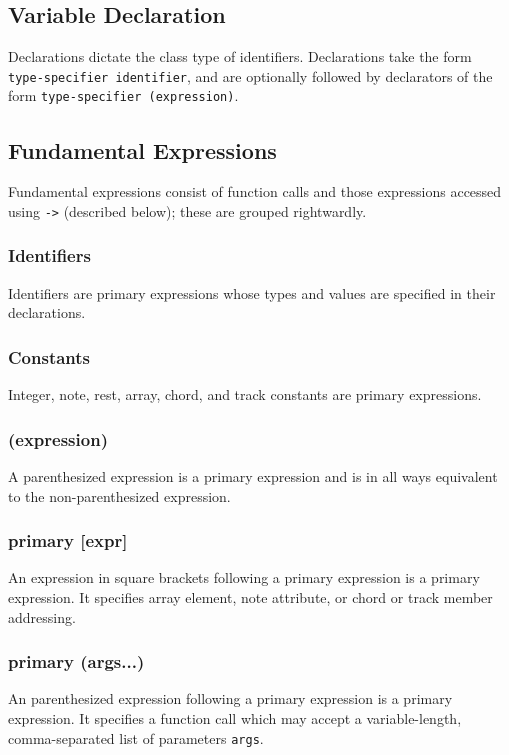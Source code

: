 \documentclass[letterpaper]{article}
\begin{document}
\subsection{Variable Declaration}
Declarations dictate the class type of identifiers. Declarations take the form
\texttt{type-specifier identifier}, and are optionally followed by declarators of the form \texttt{type-specifier (expression)}.

\subsection{Fundamental Expressions}
Fundamental expressions consist of function calls and those expressions accessed using \texttt{-\textgreater} (described below); these are grouped rightwardly.



\subsubsection{Identifiers} 
Identifiers are primary expressions whose types and values are specified in their declarations.
\subsubsection{Constants}
Integer, note, rest, array, chord, and track constants are primary expressions.
\subsubsection{(expression)}
A parenthesized expression is a primary expression and is in all ways equivalent to the non-parenthesized expression.
\subsubsection{primary [expr]}
An expression in square brackets following a primary expression is a primary expression. It specifies array element, note attribute, or chord or track member addressing. 
\subsubsection{primary (args...)}
An parenthesized expression following a primary expression is a primary expression. It specifies a function call which may accept a variable-length, comma-separated list of parameters \texttt{args}.
\end{document}
